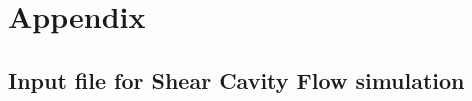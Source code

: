 \chapter{Appendix}
\label{sec:appendix}

\section{Input file for Shear Cavity Flow simulation}
\label{app:NURBSVolumenelement}




